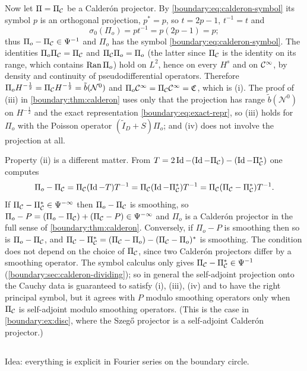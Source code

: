 Now let $\Pi=\Pi_{\mathcal{C}}$ be a Calder\'on projector. By \eqref{boundary:eq:calderon-symbol} its
symbol $p$ is an orthogonal projection, $p^*=p$, so $t=2p-1$, $t^{-1}=t$ and
\begin{equation*}
\sigma_0(\Pi_o)=pt^{-1}=p(2p-1)=p ;
\end{equation*}
thus $\Pi_o-\Pi_{\mathcal{C}}\in\Psi^{-1}$ and $\Pi_o$ has the symbol \eqref{boundary:eq:calderon-symbol}.
The identities $\Pi_o\Pi_{\mathcal{C}}=\Pi_{\mathcal{C}}$ and $\Pi_{\mathcal{C}}\Pi_o=\Pi_o$ (the latter since $\Pi_{\mathcal{C}}$ is the
identity on its range, which contains $\operatorname{Ran}\Pi_o$) hold on $L^2$, hence on every $H^s$
and on $\mathcal{C}^\infty$, by density and continuity of pseudodifferential operators. Therefore
$\Pi_oH^{-\frac12}=\Pi_{\mathcal{C}} H^{-\frac12}=\tilde b(\mathcal N^0)$ and $\Pi_o\mathcal{C}^\infty=\Pi_{\mathcal{C}}\mathcal{C}^\infty=\mathfrak{C}$,
which is (i). The proof of (iii) in \cref{boundary:thm:calderon} uses only that the
projection has range $\tilde b(\mathcal N^0)$ on $H^{-\frac12}$ and the exact representation
\eqref{boundary:eq:exact-repr}, so (iii) holds for $\Pi_o$ with the Poisson operator
$(\tilde I_D+S)\Pi_o$; and (iv) does not involve the projection at all.

Property (ii) is a different matter. From $T=2\operatorname{Id}-(\operatorname{Id}-\Pi_{\mathcal{C}})-(\operatorname{Id}-\Pi_{\mathcal{C}}^*)$ one computes
\begin{equation*}
\Pi_o-\Pi_{\mathcal{C}}=\Pi_{\mathcal{C}}(\operatorname{Id}-T)T^{-1}=\Pi_{\mathcal{C}}(\operatorname{Id}-\Pi_{\mathcal{C}}^*)T^{-1}=\Pi_{\mathcal{C}}(\Pi_{\mathcal{C}}-\Pi_{\mathcal{C}}^*)T^{-1}.
\end{equation*}
If $\Pi_{\mathcal{C}}-\Pi_{\mathcal{C}}^*\in\Psi^{-\infty}$ then $\Pi_o-\Pi_{\mathcal{C}}$ is smoothing, so $\Pi_o-P=
(\Pi_o-\Pi_{\mathcal{C}})+(\Pi_{\mathcal{C}}-P)\in\Psi^{-\infty}$ and $\Pi_o$ is a Calder\'on projector in the full
sense of \cref{boundary:thm:calderon}. Conversely, if $\Pi_o-P$ is smoothing then so is
$\Pi_o-\Pi_{\mathcal{C}}$, and $\Pi_{\mathcal{C}}-\Pi_{\mathcal{C}}^*=(\Pi_{\mathcal{C}}-\Pi_o)-(\Pi_{\mathcal{C}}-\Pi_o)^*$ is smoothing. The condition
does not depend on the choice of $\Pi_{\mathcal{C}}$, since two Calder\'on projectors differ by a
smoothing operator. The symbol calculus only gives $\Pi_{\mathcal{C}}-\Pi_{\mathcal{C}}^*\in\Psi^{-1}$
(\cref{boundary:sec:calderon-dividing}); so in general the self-adjoint projection onto the
Cauchy data is guaranteed to satisfy (i), (iii), (iv) and to have the right principal symbol,
but it agrees with $P$ modulo smoothing operators only when $\Pi_{\mathcal{C}}$ is self-adjoint modulo
smoothing operators. (This is the case in \cref{boundary:ex:disc}, where the Szeg\H{o}
projector is a self-adjoint Calder\'on projector.)

\subsection*{}
Idea: everything is explicit in Fourier series on the boundary circle.

